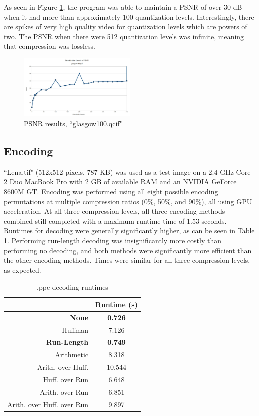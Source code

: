 \documentclass[10pt,twocolumn,twoside]{IEEEtran}
\begin{document}
As seen in Figure \ref{fig:glasgow_psnr}, the program was able to maintain a PSNR of over 30 dB when it had more than approximately 100 quantization levels. Interestingly, there are spikes of very high quality video for quantization levels which are powers of two. The PSNR when there were 512 quantization levels was infinite, meaning that compression was lossless.

\begin{figure}[htbp]
\begin{center}
\includegraphics[width=0.5\textwidth]{Images/glasgow100_psnr.jpg}
\caption{PSNR results, ``glasgow100.qcif"}
\label{fig:glasgow_psnr}
\end{center}
\end{figure}

\subsection{Encoding}
``Lena.tif" (512x512 pixels, 787 KB) was used as a test image on a 2.4 GHz Core 2 Duo MacBook Pro with 2 GB of available RAM and an NVIDIA GeForce 8600M GT. Encoding was performed using all eight possible encoding permutations at multiple compression ratios (0\%, 50\%, and 90\%), all using GPU acceleration. At all three compression levels, all three encoding methods combined still completed with a maximum runtime time of 1.53 seconds. Runtimes for decoding were generally significantly higher, as can be seen in Table \ref{table:decode_times}. Performing run-length decoding was insignificantly more costly than performing no decoding, and both methods were significantly more efficient than the other encoding methods. Times were similar for all three compression levels, as expected.

\begin{table}[htdp]
\caption{.ppc decoding runtimes}
\vskip -15pt
\label{table:decode_times}
\small{
\begin{center}
\begin{tabular}{|r|c|}
\hline
 & Runtime (s) \\
 \hline
 \textbf{None} & \textbf{0.726}\\
 \hline
 Huffman & 7.126\\
 \hline
 \textbf{Run-Length} & \textbf{0.749}\\
 \hline
 Arithmetic & 8.318\\
 \hline
 Arith. over Huff. & 10.544\\
 \hline
 Huff. over Run & 6.648\\
 \hline
 Arith. over Run & 6.851\\
 \hline
 Arith. over Huff. over Run & 9.897\\
 \hline
\end{tabular}
\end{center}
}
\end{table}
\end{document}
